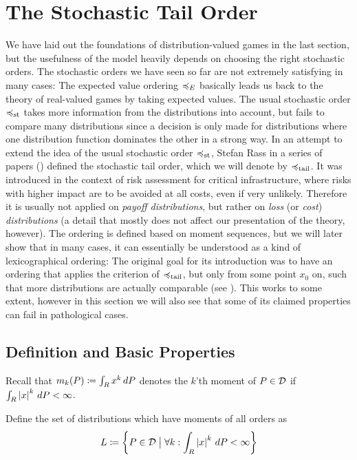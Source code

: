 \documentclass[a4paper]{scrreprt}
\begin{document}
    \section{The Stochastic Tail Order}
    We have laid out the foundations of distribution-valued games in the last section, but the usefulness of the model heavily depends on choosing the right stochastic orders.
    The stochastic orders we have seen so far are not extremely satisfying in many cases: The expected value ordering $\preccurlyeq_E$ basically leads us back to the theory of real-valued games by taking expected values. The usual stochastic order $\preccurlyeq_{\text{st}}$ takes more information from the distributions into account, but fails to compare many distributions since a decision is only made for distributions where one distribution function dominates the other in a strong way.
    In an attempt to extend the idea of the usual stochastic order $\preccurlyeq_{\text{st}}$, Stefan Rass in a series of papers (\cite{bib:rassGameRiskManagI,bib:rassGameRiskManagII,bib:rassTotalOrderingOnLossDistributions}) defined the stochastic tail order, which we will denote by $\preccurlyeq_{\text{tail}}$.
    It was introduced in the context of risk assessment for critical infrastructure, where risks with higher impact are to  be avoided at all costs, even if very unlikely.
    Therefore it is usually not applied on \emph{payoff distributions}, but rather on \emph{loss} (or \emph{cost}) \emph{distributions} (a detail that mostly does not affect our presentation of the theory, however).
    The ordering is defined based on moment sequences, but we will later show that in many cases, it can essentially be understood as a kind of lexicographical ordering: The original goal for its introduction was to have an ordering that applies the criterion of $\preccurlyeq_{\text{tail}}$, but only from some point $x_0$ on, such that more distributions are actually comparable (see \cite{bib:rassTotalOrderingOnLossDistributions}). This works to some extent, however in this section we will also see that some of its claimed properties can fail in pathological cases.

    \subsection{Definition and Basic Properties}    
    \newcommand{\Lallmoms}{L}
    Recall that $m_k(P) \coloneqq \int_{R} x^k \, dP$ denotes the $k$'th moment of $P \in \mathcal{D}$ if $\int_{R} \left| x \right|^k \, dP < \infty$.
    \begin{defn}
        Define the set of distributions which have moments of all orders as
        \begin{gather*}
            \Lallmoms \coloneqq \biggset{P \in \DP \bigmid \forall k: \lintegral{R}{\abs{x}^k}{P} < \infty}
        \end{gather*}
    \end{defn}
\end{document}
